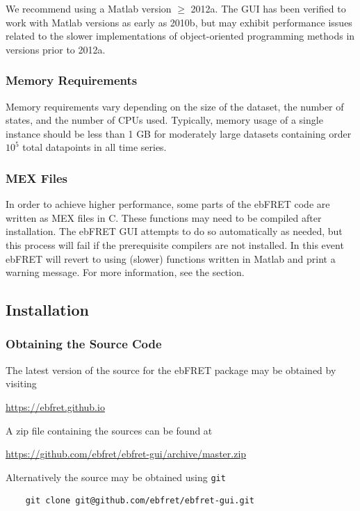 \documentclass[12pt,article,oldfontcommands]{memoir}
\newcommand{\indt}{\qquad}
\begin{document}
We recommend using a Matlab version $\ge$ 2012a. The GUI has been verified to work with Matlab versions as early as 2010b, but may exhibit performance issues related to the slower implementations of object-oriented programming methods in versions prior to 2012a.

\subsubsection{Memory Requirements}

Memory requirements vary depending on the size of the dataset, the number of states, and the number of CPUs used. Typically, memory usage of a single instance should be less than 1 GB for moderately large datasets containing order $10^5$ total datapoints in all time series. 

\subsubsection{MEX Files}

In order to achieve higher performance, some parts of the ebFRET code are written as MEX files in C. These functions may need to be compiled after installation. The ebFRET GUI attempts to do so automatically as needed, but this process will fail if the prerequisite compilers are not installed. In this event ebFRET will revert to using (slower) functions written in Matlab and print a warning message. For more information, see the \emph{} section.

\subsection{Installation}

\subsubsection{Obtaining the Source Code}

The latest version of the source for  the ebFRET package may be obtained by visiting 

\indt\url{https://ebfret.github.io}

A zip file containing the sources can be found at 

\indt\url{https://github.com/ebfret/ebfret-gui/archive/master.zip}

Alternatively the source may be obtained using \texttt{git} 
\begin{verbatim}
    git clone git@github.com/ebfret/ebfret-gui.git
\end{verbatim}
\end{document}
